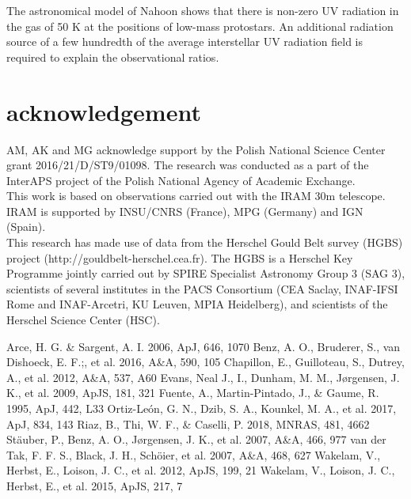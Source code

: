 \documentclass[a4paper]{article}
\renewenvironment{thebibliography}[1]{\begin{oldthebibliography}{#1}\setlength{\parskip}{0ex}\setlength{\itemsep}{0ex}}{\end{oldthebibliography}}
\begin{document}
\indent \indent The astronomical model of Nahoon shows that there is non-zero UV radiation in the gas of 50 K at the positions of low-mass protostars. An additional radiation source of a few hundredth of the average interstellar UV radiation field is required to explain the observational ratios.

\section*{\sc acknowledgement}
\indent \indent AM, AK and MG acknowledge support by the Polish National Science Center grant 2016/21/D/ST9/01098. The research was conducted as a part of the InterAPS project of the Polish National Agency of Academic Exchange.\\
This work is based on observations carried out with the IRAM 30m telescope. IRAM is supported by INSU/CNRS (France), MPG (Germany) and IGN (Spain). \\
This research has made use of data from the Herschel Gould Belt survey (HGBS) project (http://gouldbelt-herschel.cea.fr). The HGBS is a Herschel Key Programme jointly carried out by SPIRE Specialist Astronomy Group 3 (SAG 3), scientists of several institutes in the PACS Consortium (CEA Saclay, INAF-IFSI Rome and INAF-Arcetri, KU Leuven, MPIA Heidelberg), and scientists of the Herschel Science Center (HSC).

\begin{thebibliography}{10}
{\small
{} Arce, H. G. \& Sargent, A. I. 2006, ApJ, 646, 1070
 Benz, A. O., Bruderer, S., van Dishoeck, E. F.;, et al. 2016, A\&A, 590, 105
 Chapillon, E., Guilloteau, S., Dutrey, A., et al. 2012, A\&A, 537, A60
 Evans, Neal J., I., Dunham, M. M., Jørgensen, J. K., et al. 2009, ApJS, 181, 321
 Fuente, A., Martin-Pintado, J., \& Gaume, R. 1995, ApJ, 442, L33
 Ortiz-León, G. N., Dzib, S. A., Kounkel, M. A., et al. 2017, ApJ, 834, 143
 Riaz, B., Thi, W. F., \& Caselli, P. 2018, MNRAS, 481, 4662
 Stäuber, P., Benz, A. O., Jørgensen, J. K., et al. 2007, A\&A, 466, 977 
 van der Tak, F. F. S., Black, J. H., Schöier, et al. 2007, A\&A, 468, 627
 Wakelam, V., Herbst, E., Loison, J. C., et al. 2012, ApJS, 199, 21
 Wakelam, V., Loison, J. C., Herbst, E., et al. 2015, ApJS, 217, 7
}
\end{thebibliography}
\end{document}
